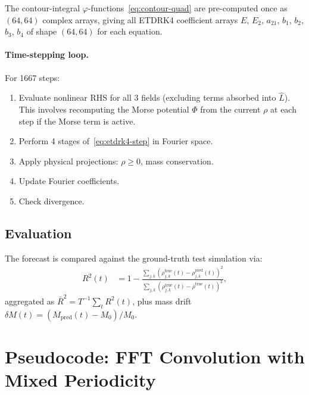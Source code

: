 \documentclass[11pt, letterpaper]{article}
\theoremstyle{definition}
\begin{document}
The contour-integral $\varphi$-functions~\eqref{eq:contour-quad}
are pre-computed once as $(64, 64)$ complex arrays, giving all ETDRK4
coefficient arrays $E$, $E_2$, $a_{21}$, $b_1$, $b_2$, $b_3$, $b_4$
of shape $(64, 64)$ for each equation.

\paragraph{Time-stepping loop.}
For 1667 steps:
\begin{enumerate}[nosep]
  \item Evaluate nonlinear RHS for all 3 fields (excluding terms
    absorbed into $\hat{L}$).  This involves recomputing the Morse
    potential $\Phi$ from the current $\rho$ at each step if the
    Morse term is active.
  \item Perform 4 stages of~\eqref{eq:etdrk4-step} in Fourier space.
  \item Apply physical projections: $\rho \ge 0$, mass conservation.
  \item Update Fourier coefficients.
  \item Check divergence.
\end{enumerate}

\subsection{Evaluation}

The forecast is compared against the ground-truth test simulation via:
\begin{align}
  R^{2}(t) &= 1 - \frac{\sum_{j,k}(\rho^{\mathrm{true}}_{j,k}(t) - \rho^{\mathrm{pred}}_{j,k}(t))^{2}}
    {\sum_{j,k}(\rho^{\mathrm{true}}_{j,k}(t) - \bar\rho^{\mathrm{true}}(t))^{2}},
\end{align}
aggregated as $\bar{R}^{2} = T^{-1}\sum_t R^{2}(t)$, plus mass drift
$\delta M(t) = (M_{\mathrm{pred}}(t) - M_0) / M_0$.

\newpage
\appendix

\section{Pseudocode: FFT Convolution with Mixed Periodicity}
\label{app:conv3d}
\end{document}
